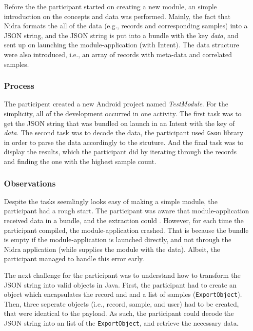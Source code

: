 Before the the participant started on creating a new module, an simple introduction on the concepts and data was performed. Mainly, the fact that Nidra formats the all of the data (e.g., records and corresponding samples) into a JSON string, and the JSON string is put into a bundle with the key \textit{data}, and sent up on launching the module-application (with Intent). The data structure were also introduced, i.e., an array of records with meta-data and correlated samples.

\subsubsection{Process}

The participent created a new Android project named \textit{TestModule}. For the simplicity, all of the development occurred in one activity. The first task was to get the JSON string that was bundled on launch in an Intent with the key of \textit{data}. The second task was to decode the data, the participant used  \verb|Gson| library in order to parse the data accordingly to the struture. And the final task was to display the results, which the participant did by iterating through the records and finding the one with the highest sample count.

\subsubsection{Observations}
Despite the tasks seemlingly looks easy of making a simple module, the participant had a rough start. The participant was aware that module-application received data in a bundle, and the extraction could . However, for each time the participant compiled, the module-application crashed. That is because the bundle is empty if the module-application is launched directly, and not through the Nidra application (while supplies the module with the data). Albeit, the participant managed to handle this error early. 

The next challenge for the participant was to understand how to transform the JSON string into valid objects in Java. First, the participant had to create an object which encapsulates the record and and a list of samples (\verb|ExportObject|). Then, three seperate objects (i.e., record, sample, and user) had to be created, that were identical to the payload. As such, the participant could decode the JSON string into an list of the \verb|ExportObject|, and retrieve the necessary data.

